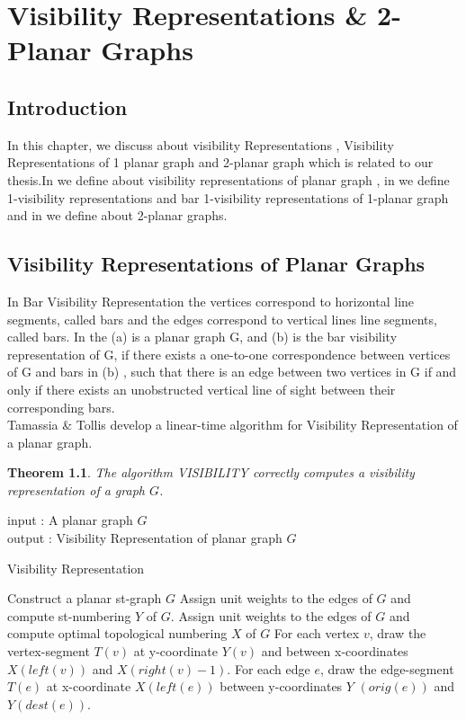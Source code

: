 \chapter{Visibility Representations \& 2-Planar Graphs}\label{visibility}
\newtheorem{theorem}{Theorem}
\newtheorem{lemma}{Lemma}
\section{Introduction}

In this chapter, we discuss about visibility Representations , Visibility Representations of 1 planar graph and 2-planar graph which is related to our thesis.In  we define about visibility representations of planar graph , in  we define 1-visibility representations and bar 1-visibility representations of 1-planar graph and in  we define about 2-planar graphs.






\section{Visibility Representations of Planar Graphs}
\label{sec:vr}

In Bar Visibility Representation \cite{R} the vertices correspond to horizontal line segments, called bars and the edges correspond to vertical lines line segments, called bars.
In the  (a) is a planar graph G, and (b) is the bar visibility representation of G, if there exists a one-to-one correspondence between vertices of G and bars in (b) , such that there is an edge between two vertices in G if and only if there exists an unobstructed vertical line of sight between their corresponding bars. 
\\
Tamassia \& Tollis \cite{R} develop a linear-time algorithm for Visibility Representation of a planar graph.


\begin{theorem} The algorithm VISIBILITY correctly computes a visibility
representation of a graph $G$.
\end{theorem}


\begin{algorithm}[H] 

input : { A planar graph $G$} \\
output : {Visibility Representation of planar graph $G$}

\caption{Visibility Representation}
\label{vr}

\begin{algorithmic}[1]
\STATE Construct a planar st-graph $G$
\STATE Assign unit weights to the edges of $G$ and compute st-numbering $Y$ of $G$.
\STATE Assign unit weights to the edges of $G$ and compute optimal topological numbering $X$ of $G$
\STATE For each vertex $v$, draw the vertex-segment $T(v)$ at y-coordinate $Y(v)$ and between x-coordinates $X(left(v))$ and $X(right(v)-1)$.
\STATE For each edge $e$, draw the edge-segment $T(e)$ at x-coordinate $X (left(e))$ between y-coordinates $Y$ $(orig(e))$ and $Y(dest(e))$.
\end{algorithmic}
\end{algorithm}




